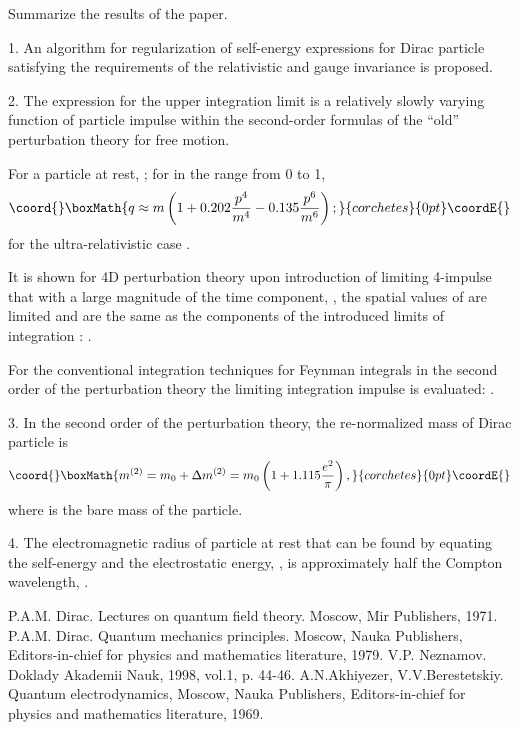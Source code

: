 \documentclass[a4paper,draft,showpacs,preprint,prd,aps]{revtex4}
\begin{document}
Summarize the results of the paper.

1. An algorithm for regularization of self-energy expressions for Dirac
particle satisfying the requirements of the relativistic and gauge
invariance is proposed.

2. The expression for the upper integration limit \coordHE{} is a
relatively slowly varying function of particle impulse within the
second-order formulas of the ``old'' perturbation theory for free motion.

For a particle at rest, \coordHE{}; for \coordHE{} in the range
from 0 to 1,
\[\coord{}\boxMath{
q \approx m\left(1 + 0.202\frac{p^4}{m^4} - 0.135\frac{p^6}{m^6}\right);
}{corchetes}{0pt}\coordE{}\]
for the ultra-relativistic case \coordHE{}.

It is shown for 4D perturbation theory upon introduction of limiting
4-impulse \coordHE{} that with a large magnitude of
the time component, \coordHE{}, the spatial values of
\coordHE{} are limited and are the same as the components of the introduced
limits of integration \coordHE{}: \coordHE{}.

For the conventional integration techniques for Feynman integrals in the
second order of the perturbation theory the limiting integration impulse is
evaluated:
\coordHE{}.

3. In the second order of the perturbation theory, the re-normalized mass of
Dirac particle is
\[\coord{}\boxMath{
m^{(2)} = m_0 + \Delta m^{(2)} = m_0
\left(1 + 1.115\frac{e^2}\pi\right),
}{corchetes}{0pt}\coordE{}\]
where \coordHE{} is the bare mass of the particle.

4. The electromagnetic radius of particle at rest that can be found by
equating the self-energy and the electrostatic energy, \coordHE{}, is
approximately half the Compton wavelength,
\coordHE{}.

\begin{thebibliography}{99}

 P.A.M. Dirac. Lectures on quantum field theory. Moscow, Mir
Publishers,
1971.
 P.A.M. Dirac. Quantum mechanics principles. Moscow, Nauka
Publishers,
Editors-in-chief for physics and mathematics literature, 1979.
 V.P. Neznamov. Doklady Akademii Nauk, 1998, vol.1, p. 44-46.
 A.N.Akhiyezer, V.V.Berestetskiy. Quantum electrodynamics,
Moscow, Nauka
Publishers, Editors-in-chief for physics and mathematics literature, 1969.

\end{thebibliography}
\end{document}
